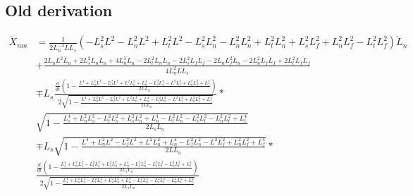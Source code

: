 \documentclass[11pt, landscape]{article}
\begin{document}
\subsection{Old derivation}
\begin{align}
  \dot{X}_{nm} &= \frac{1}{{2L_n^{-3}LL_s}}\left(-L_s^2L^2 - L_n^2L^2 + L_t^2L^2 - L_s^2L_{n}^2 - L_n^2L_{n}^2 + L_t^2L_{n}^2 + L_s^2L_{f}^2 + L_n^2L_{f}^2 - L_t^2L_{f}^2\right)\dot{L}_n\\ &+ \frac{2L_nL^2\dot{L}_n + 2L_s^2L_{n}\dot{L}_n + 4L_n^3\dot{L}_n - 2L_t^2L_{n}\dot{L}_n - 2L_s^2L_{f}\dot{L}_f - 2L_nL_{f}^2\dot{L}_n - 2L_n^2L_{f}\dot{L}_f + 2L_t^2L_{f}\dot{L}_f}{4L_n^2LL_s}\\
  &\mp L_s\frac{\frac{d}{dt}\left(1-\frac{L^4 + L_n^2L^2 - L_f^2L^2 + L^2L_{n}^2 + L_{n}^4 - L_f^2L_{n}^2 - L^2L_{f}^2 + L_n^2L_{f}^2 + L_{f}^4}{2LL_{n}}\right)}{2\sqrt{1-\frac{L^4 + L_n^2L^2 - L_f^2L^2 + L^2L_{n}^2 + L_{n}^4 - L_f^2L_{n}^2 - L^2L_{f}^2 + L_n^2L_{f}^2 + L_{f}^4}{2LL_{n}}}}*\\
  &\sqrt{1-\frac{L_{s}^4 + L_n^2L_{s}^2 - L_t^2L_{s}^2 + L_s^2L_{n}^2 + L_{n}^4 - L_t^2L_{n}^2 - L_s^2L_{t}^2 - L_n^2L_{t}^2 + L_{t}^4}{2L_{s}L_{n}}}\\
  &\mp L_s\sqrt{1-\frac{L^4 + L_n^2L^2 - L_f^2L^2 + L^2L_{n}^2 + L_{n}^4 - L_f^2L_{n}^2 - L^2L_{f}^2 + L_n^2L_{f}^2 + L_{f}^4}{2LL_{n}}}*\\
  &\frac{\frac{d}{dt}\left(1-\frac{L_{s}^4 + L_n^2L_{s}^2 - L_t^2L_{s}^2 + L_s^2L_{n}^2 + L_{n}^4 - L_t^2L_{n}^2 - L_s^2L_{t}^2 - L_n^2L_{t}^2 + L_{t}^4}{2L_{s}L_{n}}\right)}{2\sqrt{1-\frac{L_{s}^4 + L_n^2L_{s}^2 - L_t^2L_{s}^2 + L_s^2L_{n}^2 + L_{n}^4 - L_t^2L_{n}^2 - L_s^2L_{t}^2 - L_n^2L_{t}^2 + L_{t}^4}{2L_{s}L_{n}}}}\\
\end{align}
\end{document}
